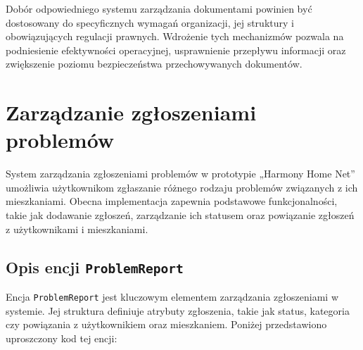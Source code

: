 Dobór odpowiedniego systemu zarządzania dokumentami powinien być dostosowany do specyficznych wymagań organizacji, jej struktury i obowiązujących regulacji prawnych. Wdrożenie tych mechanizmów pozwala na podniesienie efektywności operacyjnej, usprawnienie przepływu informacji oraz zwiększenie poziomu bezpieczeństwa przechowywanych dokumentów.


\section{Zarządzanie zgłoszeniami problemów}

System zarządzania zgłoszeniami problemów w prototypie „Harmony Home Net” umożliwia użytkownikom zgłaszanie różnego rodzaju problemów związanych z ich mieszkaniami. Obecna implementacja zapewnia podstawowe funkcjonalności, takie jak dodawanie zgłoszeń, zarządzanie ich statusem oraz powiązanie zgłoszeń z użytkownikami i mieszkaniami.

\subsection{Opis encji \texttt{ProblemReport}}

Encja \texttt{ProblemReport} jest kluczowym elementem zarządzania zgłoszeniami w systemie. Jej struktura definiuje atrybuty zgłoszenia, takie jak status, kategoria czy powiązania z użytkownikiem oraz mieszkaniem. Poniżej przedstawiono uproszczony kod tej encji:


